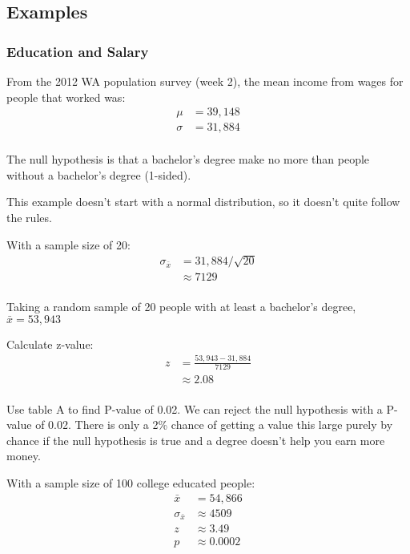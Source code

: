 \documentclass[landscape]{exam}
\begin{document}
  \subsection{Examples}

  \subsubsection{Education and Salary}

  From the 2012 WA population survey (week 2), the mean income from wages for
  people that worked was:
  \begin{align*}
    \mu    & = 39,148 \\
    \sigma & = 31,884 \\
  \end{align*}

  The null hypothesis is that a bachelor's degree make no more than people
  without a bachelor's degree (1-sided).

  This example doesn't start with a normal distribution, so it doesn't quite
  follow the rules.

  With a sample size of 20:
  \begin{align*}
    \sigma_{\bar{x}} & = 31,884 / \sqrt{20} \\
                     & \approx 7129 \\
  \end{align*}

  Taking a random sample of 20 people with at least a bachelor's degree, 
  $\bar{x} = 53,943$

  Calculate z-value:
  \begin{align*}
    z & = \frac{53,943 - 31,884}{7129} \\
      & \approx 2.08 \\
  \end{align*}

  Use table A to find P-value of 0.02. We can reject the null hypothesis with a
  P-value of 0.02. There is only a 2\% chance of getting a value this large
  purely by chance if the null hypothesis is true and a degree doesn't help you
  earn more money.

  With a sample size of 100 college educated people:
  \begin{align*}
    \bar{x}          & = 54,866 \\
    \sigma_{\bar{x}} & \approx 4509 \\
    z                & \approx 3.49 \\
    p                & \approx 0.0002 \\
  \end{align*}
\end{document}

